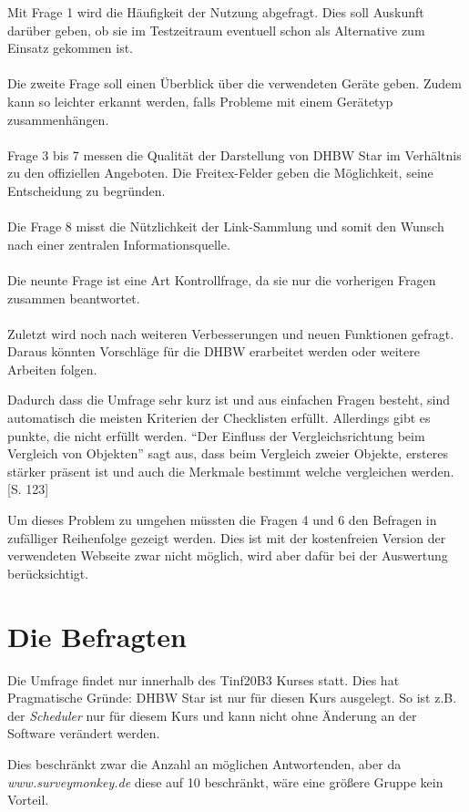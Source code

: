Mit Frage 1 wird die Häufigkeit der Nutzung abgefragt. Dies soll Auskunft darüber geben, ob sie im Testzeitraum eventuell schon als Alternative zum Einsatz gekommen ist.
\\\\
Die zweite Frage soll einen Überblick über die verwendeten Geräte geben. Zudem kann so leichter erkannt werden, falls Probleme mit einem Gerätetyp zusammenhängen.
\\\\
Frage 3 bis 7 messen die Qualität der Darstellung von DHBW Star im Verhältnis zu den offiziellen Angeboten. Die Freitex-Felder geben die Möglichkeit, seine Entscheidung zu begründen.
\\\\
Die Frage 8 misst die Nützlichkeit der Link-Sammlung und somit den Wunsch nach einer zentralen Informationsquelle.
\\\\
Die neunte Frage ist eine Art Kontrollfrage, da sie nur die vorherigen Fragen zusammen beantwortet.
\\\\
Zuletzt wird noch nach weiteren Verbesserungen und neuen Funktionen gefragt. Daraus könnten Vorschläge für die DHBW erarbeitet werden oder weitere Arbeiten folgen.
\\
\label{vergleichsproblem}

Dadurch dass die Umfrage sehr kurz ist und aus einfachen Fragen besteht, sind automatisch die meisten Kriterien der Checklisten erfüllt. Allerdings gibt es punkte, die nicht erfüllt werden. "`Der Einfluss der Vergleichsrichtung beim Vergleich von Objekten"' sagt aus, dass beim Vergleich zweier Objekte, ersteres stärker präsent ist und auch die Merkmale bestimmt welche vergleichen werden. \cite{fragebogenRolf} [S. 123]

Um dieses Problem zu umgehen müssten die Fragen 4 und 6 den Befragen in zufälliger Reihenfolge gezeigt werden. Dies ist mit der kostenfreien Version der verwendeten Webseite zwar nicht möglich, wird aber dafür bei der Auswertung berücksichtigt.

\section{Die Befragten}
Die Umfrage findet nur innerhalb des Tinf20B3 Kurses statt. Dies hat Pragmatische Gründe: DHBW Star ist nur für diesen Kurs ausgelegt. So ist z.B. der \emph{Scheduler} nur für diesem Kurs und kann nicht ohne Änderung an der Software verändert werden.

Dies beschränkt zwar die Anzahl an möglichen Antwortenden, aber da \emph{www.surveymonkey.de} diese auf 10 beschränkt, wäre eine größere Gruppe kein Vorteil.